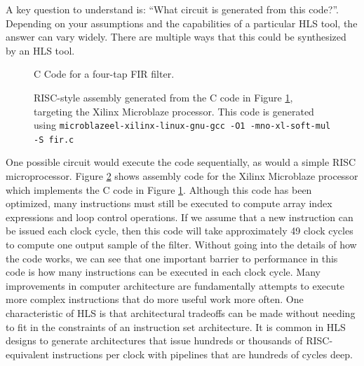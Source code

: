 A key question to understand is: ``What circuit is generated from this code?''.  Depending on your assumptions and the capabilities of a particular HLS tool, the answer can vary widely. There are multiple ways that this could be synthesized by an HLS tool. %

\begin{figure}
{

}
\caption{C Code for a four-tap FIR filter.
}\label{fig:FIR}
\end{figure}

\begin{figure}
{
\hbox{}\hbox{}
}
\caption{RISC-style assembly generated from the C code in Figure \ref{fig:FIR}, targeting the Xilinx Microblaze processor.  This code is generated using \texttt{microblazeel-xilinx-linux-gnu-gcc -O1 -mno-xl-soft-mul -S fir.c}}\label{fig:FIR_microblaze}
\end{figure}

One possible circuit would execute the code sequentially, as would a simple RISC microprocessor.  Figure \ref{fig:FIR_microblaze} shows assembly code for the Xilinx Microblaze processor which implements the C code in Figure \ref{fig:FIR}.  Although this code has been optimized, many instructions must still be executed to compute array index expressions and loop control operations.  If we assume that a new instruction can be issued each clock cycle, then this code will take approximately 49 clock cycles to compute one output sample of the filter.  Without going into the details of how the code works, we can see that one important barrier to performance in this code is how many instructions can be executed in each clock cycle.  Many improvements in computer architecture are fundamentally attempts to execute more complex instructions that do more useful work more often.  One characteristic of HLS is that architectural tradeoffs can be made without needing to fit in the constraints of an instruction set architecture.  It is common in HLS designs to generate architectures that issue hundreds or thousands of RISC-equivalent instructions per clock with pipelines that are hundreds of cycles deep.

